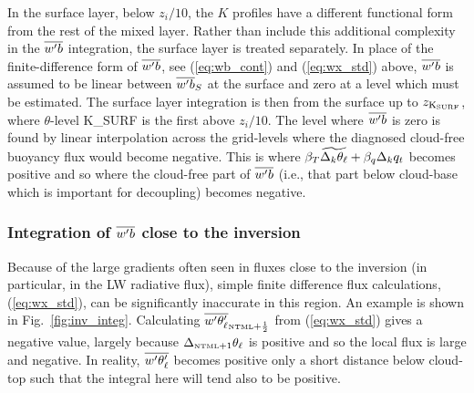 \documentclass{UMDP_article}
\begin{document}
In the surface layer, below $z_i/10$, the $K$ profiles have a
different functional form from the rest of the mixed layer.  Rather
than include this additional complexity in the $\overline{w'b}$ integration, the
surface layer is treated separately.  In place of the
finite-difference form of $\overline{w'b}$, see (\ref{eq:wb_cont}) and
(\ref{eq:wx_std}) above, $\overline{w'b}$ is assumed to be linear between $\overline{w'b}_S$
at the surface and zero at a level which must be estimated.  The
surface layer integration is then from the surface up to $z_{{\rm
    K_{SURF}}}$, where $\theta$-level K\_SURF is the first above
$z_i/10$.  The level where $\overline{w'b}$ is zero is found by linear
interpolation across the grid-levels where the diagnosed cloud-free
buoyancy flux would become negative.  This is where $\beta_T
\widetilde{\Delta_k \theta_{\ell}} + \beta_q \Delta_k q_t$ becomes positive
and so where the cloud-free part of $\overline{w'b}$ (\mbox{i.e.}, that part
below cloud-base which is important for decoupling) becomes negative.


\subsubsection{Integration of $\overline{w'b}$ close to the inversion}
\label{sec:wbint_inv}

Because of the large gradients often seen in fluxes close to the
inversion (in particular, in the LW radiative flux), simple finite
difference flux calculations, (\ref{eq:wx_std}), can be significantly
inaccurate in this region.  An example is shown in
Fig.~\ref{fig:inv_integ}.  Calculating $\overline{w'\theta_{\ell}'}_{\mbox{\tiny \rm NTML}+\frac{1}{2}}$
from (\ref{eq:wx_std}) gives a negative value, largely because
$\Delta_{\mbox{\tiny \rm NTML}+1} \theta_{\ell}$ is positive and so the local flux is large
and negative.  In reality, $\overline{w'\theta_{\ell}'}$ becomes positive only a short
distance below cloud-top such that the integral here will tend also to
be positive.
\end{document}
